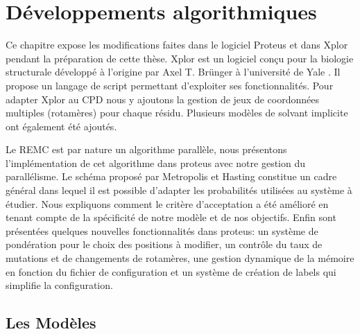 \chapter{Développements algorithmiques}
\label{chap:developpements}

Ce chapitre expose les modifications faites dans le logiciel Proteus et dans Xplor pendant la préparation de cette thèse. Xplor est un logiciel conçu pour la biologie structurale développé à l'origine par Axel T. Brünger à l'université de Yale \cite{Xplor}. Il propose un langage de script permettant d'exploiter ses fonctionnalités. Pour adapter Xplor au CPD nous y ajoutons la gestion de jeux de coordonnées multiples (rotamères) pour chaque résidu. Plusieurs modèles de solvant implicite ont également été ajoutés.

Le REMC est par nature un algorithme parallèle, nous présentons l'implémentation de cet algorithme dans proteus avec notre gestion du parallélisme. Le schéma proposé par Metropolis et Hasting constitue un cadre général dans lequel il est possible d'adapter les probabilités utilisées au système à étudier. Nous expliquons comment le critère d'acceptation a été amélioré en tenant compte de la spécificité de notre modèle et de nos objectifs. Enfin sont présentées quelques nouvelles fonctionnalités dans proteus: un système de pondération pour le choix des positions à modifier, un contrôle du taux de mutations et de changements de rotamères, une gestion dynamique de la mémoire en fonction du fichier de configuration et un système de création de labels qui simplifie la configuration.  


\section{Les Modèles }

